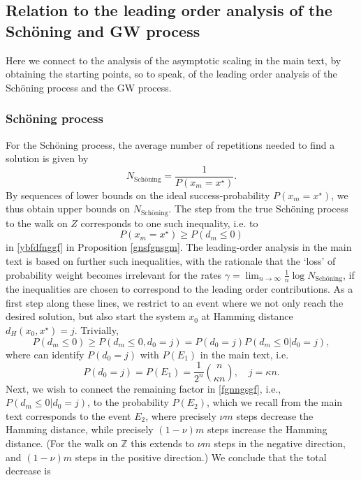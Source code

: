 \documentclass[a4paper,aps,floatfix]{revtex4}
\begin{document}

\subsection{Relation to the leading order analysis of the Sch\"oning and  GW process}
Here we connect to the analysis of the asymptotic scaling in the main text, by obtaining the starting points, so to speak, of the leading order analysis of the Sch\"oning process and the GW process.  



\subsubsection{Sch\"oning process}
For the Sch\"oning process, the average number of repetitions needed to find a solution is given by 
\begin{equation}
\label{bfgnngf}
N_{\textrm{Sch\"oning}} = \frac{1}{P(x_m = x^{\star})}.
\end{equation}
 By sequences of lower bounds on the ideal success-probability $P(x_m = x^{\star})$, we thus obtain upper bounds on $N_{\textrm{Sch\"oning}}$. The step from the true Sch\"oning process to the walk on $Z$ corresponds to one such inequality, i.e. to 
 \begin{equation}
\label{nmzuzr}
 P(x_m = x^{\star}) \geq    P(d_m\leq 0)
 \end{equation}
  in \eqref{ybfdfnggf} in Proposition \eqref{gnsfgnsgm}.
The leading-order analysis in the main text is based on further such inequalities, with the rationale that the `loss' of probability weight becomes irrelevant for the rates $\gamma = \lim_{n\rightarrow\infty} \frac{1}{n}\log N_{\textrm{Sch\"oning}}$, if the inequalities are chosen to correspond to the leading order contributions.  As a first step along these lines, we restrict to an event where we not only reach the desired solution, but also start the system $x_0$ at Hamming distance  $d_H(x_0,x^{\star}) = j$.
 Trivially, 
\begin{equation}
\label{fgnngsgf}
 P(d_m\leq 0) \geq P(d_m\leq 0, d_0 = j) = P(d_0 = j)P(d_m \leq 0|d_0 = j),
\end{equation}
where can identify $P(d_0 = j)$ with $P(E_1)$ in the main text, i.e. 
\begin{equation}
\label{gfnfsgmgsfm}
P(d_0 = j)  = P(E_1) = \frac{1}{2^n}\binom{n}{\kappa n},\quad j = \kappa n. 
\end{equation}
Next, we wish to connect the remaining factor  in \eqref{fgnngsgf}, i.e.,  $P(d_m\leq 0|d_0 = j)$, to the probability $P(E_2)$, which we recall from the main text corresponds to the event $E_2$, where precisely $\nu m$ steps decrease the Hamming distance, while precisely $(1-\nu)m$ steps increase the Hamming distance. (For the walk on $\mathbb{Z}$ this extends to  $\nu m$ steps in the negative direction, and $(1-\nu)m$ steps in the positive direction.) We conclude that the total decrease is 
\end{document}
